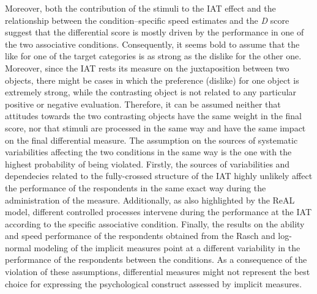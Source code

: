 \documentclass[12pt]{book}
\begin{document}
Moreover, both the contribution of the stimuli to the IAT effect and the relationship between the condition--specific speed estimates and the \emph{D} score suggest that the differential score is mostly driven by the performance in one of the two associative conditions. 
Consequently, it seems bold to assume that the like for one of the target categories is as strong as the dislike for the other one. 
Moreover, since the IAT rests its measure on the juxtaposition between two objects, there might be cases in which the preference (dislike) for one object is extremely strong, while the contrasting object is not related to any particular positive or negative evaluation.
Therefore, it can be assumed neither that attitudes towards the two contrasting objects have the same weight in the final score, nor that stimuli are processed in the same way and have the same impact on the final differential measure. 
The assumption on the sources of systematic variabilities affecting the two conditions in the same way is the one with the highest probability of being violated. 
Firstly, the sources of variabilities and dependecies related to the fully-crossed structure of the IAT highly unlikely affect the performance of the respondents in the same exact way during the administration of the measure. 
Additionally, as also highlighted by the ReAL model, different controlled processes intervene during the performance at the IAT according to the specific associative condition.
Finally, the results on the ability and speed performance of the respondents obtained from the Rasch and log-normal modeling of the implicit measures point at a different variability in the performance of the respondents between the conditions.  
As a consequence of the violation of these assumptions, differential measures might not represent the best choice for expressing the psychological construct assessed by implicit measures. 
\end{document}
